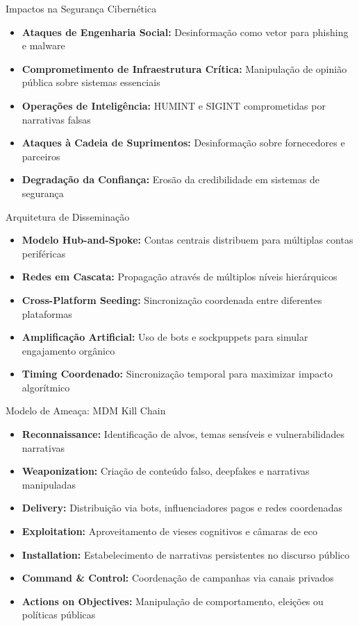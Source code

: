 \documentclass[aspectratio=169,xcolor=table]{beamer}
\begin{document}
\begin{frame}{Impactos na Segurança Cibernética}
    \begin{itemize}
        \item \textbf{Ataques de Engenharia Social:} Desinformação como vetor para phishing e malware
        \item \textbf{Comprometimento de Infraestrutura Crítica:} Manipulação de opinião pública sobre sistemas essenciais
        \item \textbf{Operações de Inteligência:} HUMINT e SIGINT comprometidas por narrativas falsas
        \item \textbf{Ataques à Cadeia de Suprimentos:} Desinformação sobre fornecedores e parceiros
        \item \textbf{Degradação da Confiança:} Erosão da credibilidade em sistemas de segurança
    \end{itemize}
\end{frame}

\begin{frame}{Arquitetura de Disseminação}
    \begin{itemize}
        \item \textbf{Modelo Hub-and-Spoke:} Contas centrais distribuem para múltiplas contas periféricas
        \item \textbf{Redes em Cascata:} Propagação através de múltiplos níveis hierárquicos
        \item \textbf{Cross-Platform Seeding:} Sincronização coordenada entre diferentes plataformas
        \item \textbf{Amplificação Artificial:} Uso de bots e sockpuppets para simular engajamento orgânico
        \item \textbf{Timing Coordenado:} Sincronização temporal para maximizar impacto algorítmico
    \end{itemize}
\end{frame}

\begin{frame}{Modelo de Ameaça: MDM Kill Chain}
    \begin{itemize}
        \item \textbf{Reconnaissance:} Identificação de alvos, temas sensíveis e vulnerabilidades narrativas
        \item \textbf{Weaponization:} Criação de conteúdo falso, deepfakes e narrativas manipuladas
        \item \textbf{Delivery:} Distribuição via bots, influenciadores pagos e redes coordenadas
        \item \textbf{Exploitation:} Aproveitamento de vieses cognitivos e câmaras de eco
        \item \textbf{Installation:} Estabelecimento de narrativas persistentes no discurso público
        \item \textbf{Command \& Control:} Coordenação de campanhas via canais privados
        \item \textbf{Actions on Objectives:} Manipulação de comportamento, eleições ou políticas públicas
    \end{itemize}
\end{frame}
\end{document}
